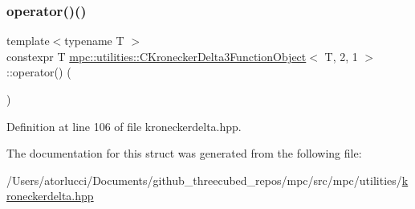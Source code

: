 \subsubsection{\texorpdfstring{operator()()}{operator()()}}
{\footnotesize\ttfamily template$<$typename T $>$ \\
constexpr T \mbox{\hyperlink{structmpc_1_1utilities_1_1_c_kronecker_delta3_function_object}{mpc\+::utilities\+::\+C\+Kronecker\+Delta3\+Function\+Object}}$<$ T, 2, 1 $>$\+::operator() (\begin{DoxyParamCaption}{ }\end{DoxyParamCaption})\hspace{0.3cm}{\ttfamily [inline]}}



Definition at line 106 of file kroneckerdelta.\+hpp.



The documentation for this struct was generated from the following file\+:\begin{DoxyCompactItemize}
\item 
/\+Users/atorlucci/\+Documents/github\+\_\+threecubed\+\_\+repos/mpc/src/mpc/utilities/\mbox{\hyperlink{kroneckerdelta_8hpp}{kroneckerdelta.\+hpp}}\end{DoxyCompactItemize}
